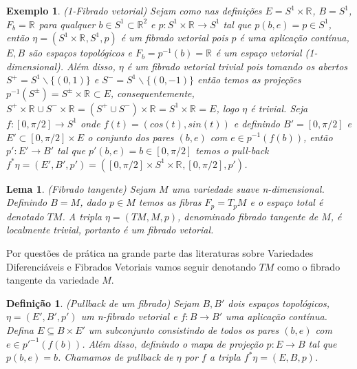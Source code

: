 \documentclass[12pt]{book}
\newtheorem{lema}[teorema]{Lema}
\newtheorem{definicao}[teorema]{Definição}
\newtheorem{exemplo}[teorema]{Exemplo}
\newcommand{\real}[1]{\mathbb{R}^{#1}}
\newcommand{\vermelho}[1]{{\color{red}#1}}
\begin{document}
	\begin{exemplo}
		(1-Fibrado vetorial) Sejam como nas definições $E=S^{1} \times \real{}$, $B=S^{1}$, $F_{b} = \real{}$ para qualquer $b \in S^{1}\subset \real{2}$ e $p:S^{1} \times \real{}\to S^{1}$ tal que $p(b, e)=p \in S^{1}$, então $\eta=(S^{1} \times \real{}, S^{1}, p)$ é um fibrado vetorial pois $p$ é uma aplicação contínua, $E, B$ são espaços topológicos e $F_{b} = p^{-1}(b) = \real{}$ é um espaço vetorial (1-dimensional). Além disso, $\eta$ é um fibrado vetorial trivial pois tomando os abertos $S^{+} = S^{1} \backslash \{(0,1)\}$ e $S^{-} = S^{1} \backslash \{(0,-1)\}$ então temos as projeções $p^{-1}(S^{\pm}) = S^{\pm} \times \real{} \subset E$, consequentemente, $S^{+}\times\real{} \cup S^{-}\times\real{} = (S^{+}\cup S^{-})\times\real{} = S^{1} \times\real{} =E$, logo $\eta$ é trivial. Seja $f:[0,\pi/2] \to S^{1}$ onde $f(t) = (cos(t), sin(t))$ e definindo $B' =[0,\pi/2]$ e $E' \subset [0,\pi/2]\times E$ o conjunto dos pares $(b, e)$ com $e \in p^{-1}(f(b))$, então $p': E'\to B'$ tal que $p'(b, e) = b \in [0,\pi/2]$ \vermelho{temos o pull-back $f^{*}\eta = (E', B', p') = ([0,\pi/2]\times S^{1}\times \real{}, [0,\pi/2], p')$.}
	\end{exemplo}
	
	\begin{lema}
		(Fibrado tangente) Sejam $M$ uma variedade suave n-dimensional. Definindo $B=M$, dado $p\in M$ temos as fibras $F_{p} = T_{p}M$ e o espaço total é denotado $TM$. A tripla $\eta = (TM, M, p)$, denominado fibrado tangente de $M$, é localmente trivial, portanto é um fibrado vetorial.
	\end{lema}
	
	Por questões de prática na grande parte das literaturas sobre Variedades Diferenciáveis e Fibrados Vetoriais vamos seguir denotando $TM$ como o fibrado tangente da variedade $M$.
	
	\begin{definicao}
		(Pullback de um fibrado) Sejam $B, B'$ dois espaços topológicos, $\eta=(E', B', p')$ um n-fibrado vetorial e $f:B\to B'$ uma aplicação contínua. Defina $E \subseteq B\times E'$ um subconjunto consistindo de todos os pares $(b, e)$ com $e\in p'^{-1}(f(b))$. Além disso, definindo o mapa de projeção $p:E\to B$ tal que $p(b,e) = b$. Chamamos de pullback de $\eta$ por $f$ a tripla $f^{*}\eta = (E,B, p)$.
	\end{definicao}
	
\end{document}
